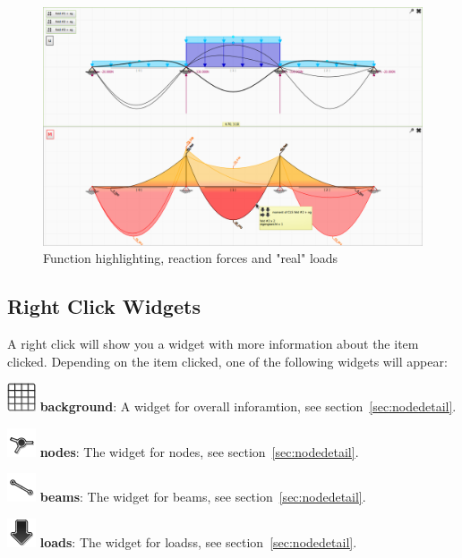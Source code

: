\documentclass[a4paper,11pt]{report}
\begin{document}
\begin{figure}[H]
\begin{center}
\includegraphics[width=\textwidth]{../pictures/clshighlighted.png}
\caption{Function highlighting, reaction forces and "real" loads}
\label{pic:clshighlighted}
\end{center}
\end{figure}

\subsection{Right Click Widgets}
\label{sec:rightclickwidgets}

A right click will show you a widget with more information about the item clicked. Depending on the item clicked, one of the following widgets will appear:
\begin{trivlist}
	\leftskip=1cm
	\item[] \includegraphics[scale = 0.5]{../../icons/grid.png} \textbf{background}: A widget for overall inforamtion, see section~\ref{sec:nodedetail}.
	\item[] \includegraphics[scale = 0.5]{../../icons/node.png} \textbf{nodes}: The widget for nodes, see section~\ref{sec:nodedetail}.
	\item[] \includegraphics[scale = 0.5]{../../icons/beam.png} \textbf{beams}: The widget for beams, see section~\ref{sec:nodedetail}.
	\item[] \includegraphics[scale = 0.5]{../../icons/load.png} \textbf{loads}: The widget for loadss, see section~\ref{sec:nodedetail}.
	
\end{trivlist}
\end{document}
